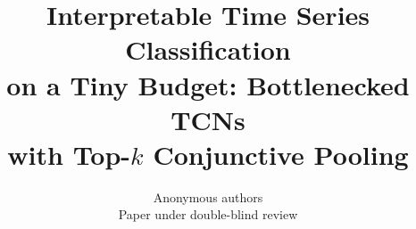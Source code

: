 \documentclass{article}
\title{Interpretable Time Series Classification\\
       on a Tiny Budget: Bottlenecked TCNs\\
       with Top-$k$ Conjunctive Pooling}
\author{Anonymous authors\\
Paper under double-blind review}
\begin{document}
\maketitle

\begin{abstract}

\end{abstract}














\appendix

\end{document}
